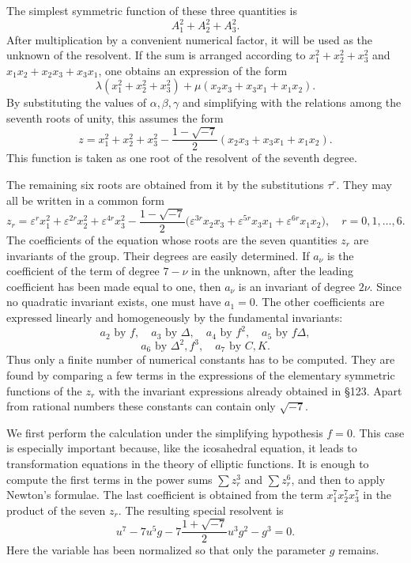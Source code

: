 \documentclass[12pt,a4paper]{article}
\newcommand{\eps}{\varepsilon}
\begin{document}
The simplest symmetric function of these three quantities is
\[
 A_1^2+A_2^2+A_3^2.
\]
After multiplication by a convenient numerical factor, it will be used as the unknown of the resolvent.  If the sum is arranged according to \(x_1^2+x_2^2+x_3^2\) and \(x_1x_2+x_2x_3+x_3x_1\), one obtains an expression of the form
\[
 \lambda(x_1^2+x_2^2+x_3^2)+\mu(x_2x_3+x_3x_1+x_1x_2).
\]
By substituting the values of \(\alpha,\beta,\gamma\) and simplifying with the relations among the seventh roots of unity, this assumes the form
\begin{equation}
 z=x_1^2+x_2^2+x_3^2-\frac{1-\sqrt{-7}}{2}(x_2x_3+x_3x_1+x_1x_2). \tag{2}
\end{equation}
This function is taken as one root of the resolvent of the seventh degree.

The remaining six roots are obtained from it by the substitutions \(\tau^r\).  They may all be written in a common form
\begin{equation}
 z_r=\eps^r x_1^2+\eps^{2r}x_2^2+\eps^{4r}x_3^2
 -\frac{1-\sqrt{-7}}{2}\bigl(\eps^{3r}x_2x_3+\eps^{5r}x_3x_1+\eps^{6r}x_1x_2\bigr),
 \quad r=0,1,\ldots,6. \tag{3}
\end{equation}
The coefficients of the equation whose roots are the seven quantities \(z_r\) are invariants of the group.  Their degrees are easily determined.  If \(a_\nu\) is the coefficient of the term of degree \(7-\nu\) in the unknown, after the leading coefficient has been made equal to one, then \(a_\nu\) is an invariant of degree \(2\nu\).  Since no quadratic invariant exists, one must have \(a_1=0\).  The other coefficients are expressed linearly and homogeneously by the fundamental invariants:
\[
 a_2 \text{ by } f,
\quad a_3 \text{ by } \Delta,
\quad a_4 \text{ by } f^2,
\quad a_5 \text{ by } f\Delta,
\]
\[
 a_6 \text{ by } \Delta^2, f^3,
\quad a_7 \text{ by } C,K.
\]
Thus only a finite number of numerical constants has to be computed.  They are found by comparing a few terms in the expressions of the elementary symmetric functions of the \(z_r\) with the invariant expressions already obtained in \S 123.  Apart from rational numbers these constants can contain only \(\sqrt{-7}\).

We first perform the calculation under the simplifying hypothesis \(f=0\).  This case is especially important because, like the icosahedral equation, it leads to transformation equations in the theory of elliptic functions.  It is enough to compute the first terms in the power sums \(\sum z_r^3\) and \(\sum z_r^6\), and then to apply Newton's formulae.  The last coefficient is obtained from the term \(x_1^7x_2^7x_3^7\) in the product of the seven \(z_r\).  The resulting special resolvent is
\begin{equation}
 u^7-7u^5g-7\frac{1+\sqrt{-7}}{2}u^3g^2-g^3=0. \tag{4}
\end{equation}
Here the variable has been normalized so that only the parameter \(g\) remains.
\end{document}
